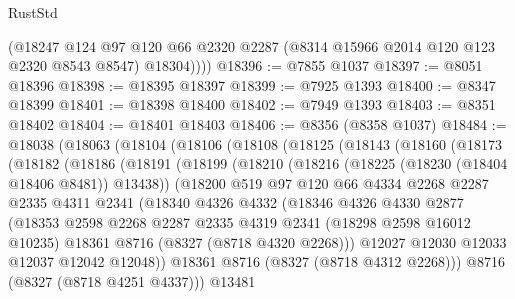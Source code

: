 \begin{lexlean}{RustStd}
\begin{coremodule}
          (@18247
            @124
            @97
            @120
            @66
            @2320
            @2287
            (@8314 @15966 @2014 @120 @123 @2320 @8543 @8547)
            @18304))))
@18396 := @7855 @1037
@18397 := @8051 @18396
@18398 := @18395 @18397
@18399 := @7925 @1393
@18400 := @8347 @18399
@18401 := @18398 @18400
@18402 := @7949 @1393
@18403 := @8351 @18402
@18404 := @18401 @18403
@18406 := @8356 (@8358 @1037)
@18484 := @18038
    (@18063
      (@18104
        (@18106
          (@18108
            (@18125
              (@18143
                (@18160
                  (@18173
                    (@18182
                      (@18186
                        (@18191
                          (@18199
                            (@18210
                              (@18216 (@18225 (@18230 (@18404 @18406 @8481)) @13438))
                              (@18200
                                @519
                                @97
                                @120
                                @66
                                @4334
                                @2268
                                @2287
                                @2335
                                @4311
                                @2341
                                (@18340
                                  @4326
                                  @4332
                                  (@18346
                                    @4326
                                    @4330
                                    @2877
                                    (@18353
                                      @2598
                                      @2268
                                      @2287
                                      @2335
                                      @4319
                                      @2341
                                      (@18298 @2598 @16012 @10235)
                                      @18361
                                      @8716
                                      (@8327 (@8718 @4320 @2268)))
                                    @12027
                                    @12030
                                    @12033
                                    @12037
                                    @12042
                                    @12048))
                                @18361
                                @8716
                                (@8327 (@8718 @4312 @2268)))
                              @8716
                              (@8327 (@8718 @4251 @4337)))
                            @13481

\end{coremodule}
\end{lexlean}
